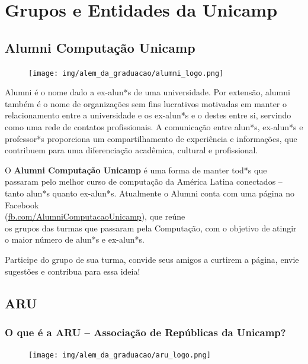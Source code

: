 
\section{Grupos e Entidades da Unicamp}

\subsection{Alumni Computação Unicamp}

\begin{figure}[H]
    \centering
    \texttt{[image: img/alem\_da\_graduacao/alumni\_logo.png]}
\end{figure}

Alumni é o nome dado a ex-alun*s de uma universidade. Por extensão, alumni
também é o nome de organizações sem fins lucrativos motivadas em manter o
relacionamento entre a universidade e os ex-alun*s e o destes entre si,
servindo como uma rede de contatos profissionais. A comunicação entre alun*s,
ex-alun*s e professor*s proporciona um compartilhamento de experiência e
informações, que contribuem para uma diferenciação acadêmica, cultural e
profissional.

O \textbf{Alumni Computação Unicamp} é uma forma de manter tod*s que passaram
pelo melhor curso de computação da América Latina conectados -- tanto alun*s
quanto ex-alun*s. Atualmente o Alumni conta com uma página no Facebook
\\(\url{fb.com/AlumniComputacaoUnicamp}), que reúne\\os grupos das turmas que
passaram pela Computação, com o objetivo de atingir o maior número de alun*s e
ex-alun*s.

Participe do grupo de sua turma, convide seus amigos a curtirem a página, envie
sugestões e contribua para essa ideia!

\subsection{ARU}

\subsubsection{O que é a ARU – Associação de Repúblicas da Unicamp?}

\begin{figure}[H]
    \centering
    \texttt{[image: img/alem\_da\_graduacao/aru\_logo.png]}
\end{figure}

